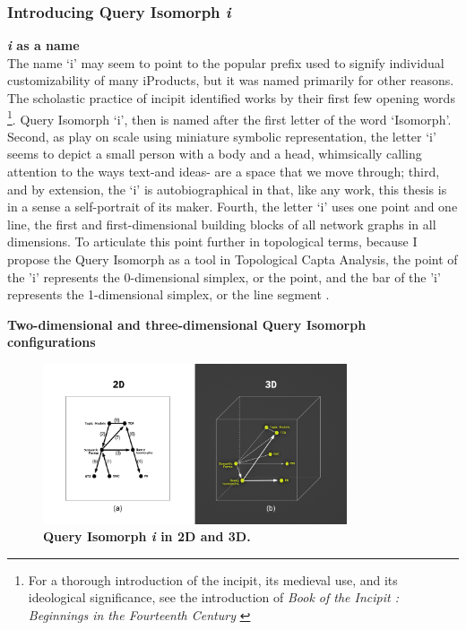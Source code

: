 \subsubsection{Introducing Query Isomorph \textit{i}}

\textbf{\textit{i} as a name}
\\

The name `i' may seem to point to the popular prefix used to signify individual customizability of many iProducts, but it was named primarily for other reasons. The scholastic practice of incipit identified works by their first few opening words \citep[p. 3]{smith_book_2001} \footnote{For a thorough introduction of the incipit, its medieval use, and its ideological significance, see the introduction of \textit{Book of the Incipit : Beginnings in the Fourteenth Century} \citep[p. 3]{smith_book_2001}}. Query Isomorph `i', then is named after the first letter of the word `Isomorph'. Second, as play on scale using miniature symbolic representation, the letter `i' seems to depict a small person with a body and a head, whimsically calling attention to the ways text-and ideas- are a space that we move through; third, and by extension, the `i' is autobiographical in that, like any work, this thesis is in a sense a self-portrait of its maker. Fourth, the letter `i' uses one point and one line, the first and first-dimensional building blocks of all network graphs in all dimensions. To articulate this point further in topological terms, because I propose the Query Isomorph as a tool in Topological Capta Analysis, the point of the 'i' represents the 0-dimensional simplex, or the point, and the bar of the 'i' represents the 1-dimensional simplex, or the line segment \citep[p. 3]{maletic_statistical_2011}.
       



\textbf{Two-dimensional and three-dimensional Query Isomorph configurations}
\\

\FloatBarrier  
\begin{figure}[h]
    \centering
    \includegraphics[width=0.8\textwidth]{figures/5.7.Q i.png}
    \caption[Query Isomorph \textit{i} in 2D and 3D]{\textbf{Query Isomorph \textit{i} in 2D and 3D.}
}
    \label{f5.7.Q i}
\end{figure}
\clearpage
\FloatBarrier


